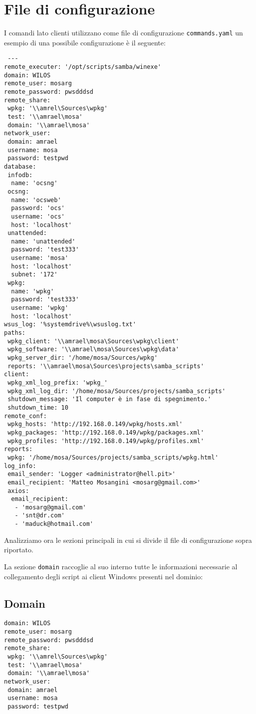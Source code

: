 \documentclass[a4paper,10pt,oneside]{memoir}
\begin{document}
\section*{File di configurazione}
I comandi lato clienti utilizzano come file di configurazione \verb#commands.yaml# un esempio di una possibile configurazione è il seguente:
\begin{verbatim}
 ---
remote_executer: '/opt/scripts/samba/winexe'
domain: WILOS
remote_user: mosarg
remote_password: pwsdddsd
remote_share:
 wpkg: '\\amrel\Sources\wpkg'
 test: '\\amrael\mosa'
 domain: '\\amrael\mosa'
network_user:
 domain: amrael
 username: mosa 
 password: testpwd
database:
 infodb:
  name: 'ocsng'
 ocsng:
  name: 'ocsweb'
  password: 'ocs'
  username: 'ocs'
  host: 'localhost'
 unattended:
  name: 'unattended'
  password: 'test333'
  username: 'mosa'
  host: 'localhost'
  subnet: '172' 
 wpkg:
  name: 'wpkg'
  password: 'test333'
  username: 'wpkg'
  host: 'localhost'
wsus_log: '%systemdrive%\wsuslog.txt'
paths:
 wpkg_client: '\\amrael\mosa\Sources\wpkg\client'
 wpkg_software: '\\amrael\mosa\Sources\wpkg\data'
 wpkg_server_dir: '/home/mosa/Sources/wpkg'
 reports: '\\amrael\mosa\Sources\projects\samba_scripts'
client:
 wpkg_xml_log_prefix: 'wpkg_'
 wpkg_xml_log_dir: '/home/mosa/Sources/projects/samba_scripts'
 shutdown_message: 'Il computer è in fase di spegnimento.'
 shutdown_time: 10
remote_conf:
 wpkg_hosts: 'http://192.168.0.149/wpkg/hosts.xml'
 wpkg_packages: 'http://192.168.0.149/wpkg/packages.xml'
 wpkg_profiles: 'http://192.168.0.149/wpkg/profiles.xml'
reports:
 wpkg: '/home/mosa/Sources/projects/samba_scripts/wpkg.html'
log_info: 
 email_sender: 'Logger <administrator@hell.pit>'
 email_recipient: 'Matteo Mosangini <mosarg@gmail.com>'
 axios:
  email_recipient:
   - 'mosarg@gmail.com'
   - 'snt@dr.com'
   - 'maduck@hotmail.com'
\end{verbatim}

Analizziamo ora le sezioni principali in cui si divide il file di configurazione sopra riportato.

La sezione \verb#domain# raccoglie al suo interno tutte le informazioni necessarie al collegamento degli script ai client Windows presenti nel dominio:

\subsection*{Domain}
\begin{verbatim}
domain: WILOS
remote_user: mosarg
remote_password: pwsdddsd
remote_share:
 wpkg: '\\amrel\Sources\wpkg'
 test: '\\amrael\mosa'
 domain: '\\amrael\mosa'
network_user:
 domain: amrael
 username: mosa 
 password: testpwd
\end{verbatim}
\end{document}
